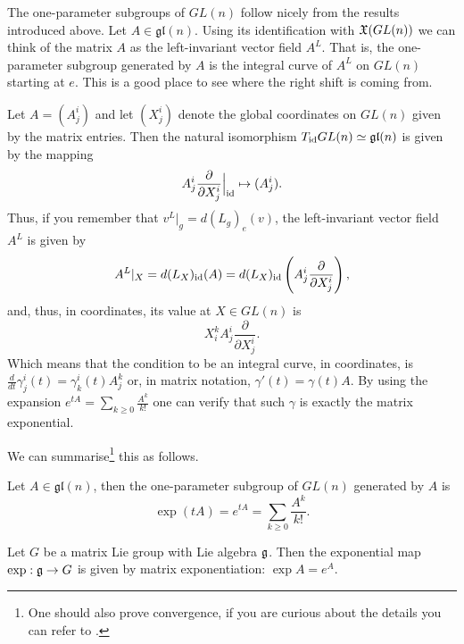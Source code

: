 The one-parameter subgroups of $GL(n)$ follow nicely from the results introduced above.
Let $A\in\mathfrak{gl}(n)$. Using its identification with $\mathfrak{X}(GL(n))$ we can think of the matrix $A$ as the left-invariant vector field $A^L$.
That is, the one-parameter subgroup generated by $A$ is the integral curve of $A^L$ on $GL(n)$ starting at $e$.
This is a good place to see where the right shift is coming from.

Let $A = (A^i_j)$ and let $(X^i_j)$ denote the global coordinates on $GL(n)$ given by the matrix entries.
Then the natural isomorphism $T_{\operatorname{id}}GL(n) \simeq \mathfrak{gl}(n)$ is given by the mapping
\begin{equation}
  A^i_j \frac{\partial }{\partial X^i_j}\Big|_{\operatorname{id}} \mapsto (A^i_j).
\end{equation}
Thus, if you remember that $v^L|_g = d(L_g)_e(v)$, the left-invariant vector field $A^L$ is given by
\begin{equation}
  A^L|_X = d(L_X)_{\operatorname{id}}(A) = d(L_X)_{\operatorname{id}}\left(A^i_j \frac{\partial }{\partial X^i_j}\right),
\end{equation}
and, thus, in coordinates, its value at $X\in GL(n)$ is
\begin{equation}
  X^k_i A^i_j \frac{\partial }{\partial X^i_j}.
\end{equation}
Which means that the condition to be an integral curve, in coordinates, is $\frac{d}{dt}\gamma^i_j(t) = \gamma^i_k(t) A^k_j$ or, in matrix notation, $\gamma'(t) = \gamma(t) A$.
By using the expansion $e^{tA} = \sum_{k\geq 0} \frac{A^k}{k!}$ one can verify that such $\gamma$ is exactly the matrix exponential.

We can summarise\footnote{One should also prove convergence, if you are curious about the details you can refer to \cite[Proposition 20.2]{book:lee}.} this as follows.

\begin{proposition}\label{prop:expmat}
  Let $A\in\mathfrak{gl}(n)$, then the one-parameter subgroup of $GL(n)$ generated by $A$ is
  \begin{equation}
    \exp(tA) = e^{tA} = \sum_{k\geq 0} \frac{A^k}{k!}.
  \end{equation}
\end{proposition}

\begin{corollary}
  Let $G$ be a matrix Lie group with Lie algebra $\mathfrak{g}$.
  Then the exponential map $\exp:\mathfrak{g}\to G$ is given by matrix exponentiation: $\exp A = e^A$.
\end{corollary}

